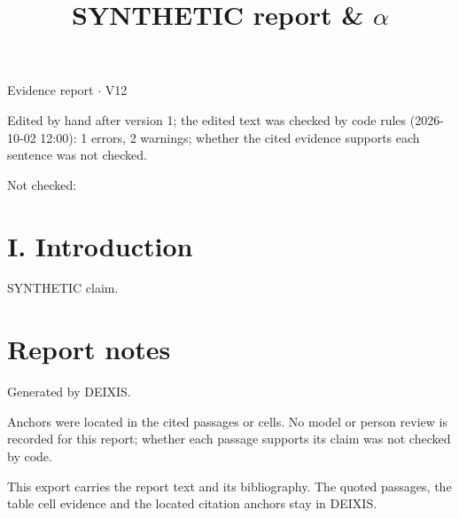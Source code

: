 \documentclass[journal]{IEEEtran}
\begin{document}
\title{SYNTHETIC report \& \ensuremath{\alpha}}

\maketitle

\noindent Evidence report \ensuremath{\cdot} V12

\noindent Edited by hand after version 1; the edited text was checked by code rules (2026-10-02 12:00): 1 errors, 2 warnings; whether the cited evidence supports each sentence was not checked.

\noindent Not checked:

\section*{I. Introduction}

SYNTHETIC claim. \cite{Synth26}

\section*{Report notes}

Generated by DEIXIS.

Anchors were located in the cited passages or cells. No model or person review is recorded for this report; whether each passage supports its claim was not checked by code.

This export carries the report text and its bibliography. The quoted passages, the table cell evidence and the located citation anchors stay in DEIXIS.




\end{document}
